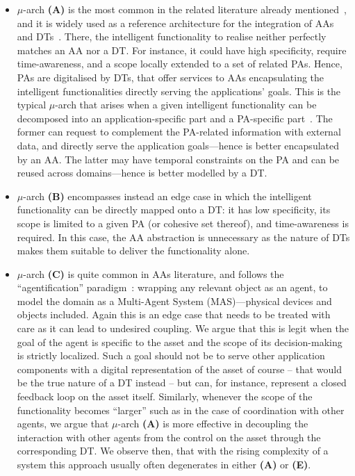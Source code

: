 \begin{itemize}
    \item $\mu$-arch \textbf{(A)} is the most common in the related literature already mentioned~\cite{DBLP:conf/atal/MarianiPR22,DBLP:conf/emas/MarianiPR23,10.1145/3507909}, and it is widely used as a reference architecture for the integration of AAs and DTs~\cite{DBLP:conf/atal/MarianiPR22}. 
    There, the intelligent functionality to realise neither perfectly matches an AA nor a DT. 
    For instance, it could have high specificity, require time-awareness, and a scope locally extended to a set of related PAs. 
    Hence, PAs are digitalised by DTs, that offer services to AAs encapsulating the intelligent functionalities directly serving the applications' goals. 
    This is the typical $\mu$-arch that arises when a given intelligent functionality can be decomposed into an application-specific part and a PA-specific part~\cite{DBLP:conf/atal/MarianiPR22}. 
    The former can request to complement the PA-related information with external data, and directly serve the application goals---hence is better encapsulated by an AA. 
    The latter may have temporal constraints on the PA and can be reused across domains---hence is better modelled by a DT. 
    \item $\mu$-arch \textbf{(B)} encompasses instead an edge case in which the intelligent functionality can be directly mapped onto a DT: it has low specificity, its scope is limited to a given PA (or cohesive set thereof), and time-awareness is required. 
    In this case, the AA abstraction is unnecessary as the nature of DTs makes them suitable to deliver the functionality alone. 
    \item $\mu$-arch \textbf{(C)}
    is quite common in AAs literature, and follows the ``agentification'' paradigm~\cite{PicoValencia2018,Savaglio2020}: wrapping any relevant object as an agent, to model the domain as a Multi-Agent System (MAS)---physical devices and objects included. 
    Again this is an edge case that needs to be treated with care as it can lead to undesired coupling. We argue that this is legit when the goal of the agent is specific to the asset and the scope of its decision-making is strictly localized. Such a goal should not be to serve other application components with a digital representation of the asset of course -- that would be the true nature of a DT instead -- but can, for instance, represent a closed feedback loop on the asset itself. Similarly, whenever the scope of the functionality becomes ``larger'' such as in the case of coordination with other agents, we argue that $\mu$-arch \textbf{(A)} is more effective in decoupling the interaction with other agents from the control on the asset through the corresponding DT. We observe then, that with the rising complexity of a system this approach usually often degenerates in either \textbf{(A)} or \textbf{(E)}.

\end{itemize}
